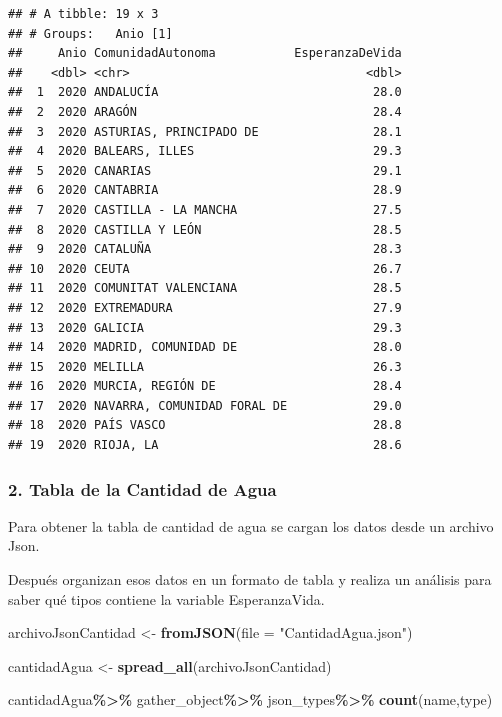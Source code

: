 \documentclass[
]{article}
\newenvironment{Shaded}{\begin{snugshade}}{\end{snugshade}}
\newcommand{\AttributeTok}[1]{\textcolor[rgb]{0.13,0.29,0.53}{#1}}
\newcommand{\FunctionTok}[1]{\textcolor[rgb]{0.13,0.29,0.53}{\textbf{#1}}}
\newcommand{\NormalTok}[1]{#1}
\newcommand{\OtherTok}[1]{\textcolor[rgb]{0.56,0.35,0.01}{#1}}
\newcommand{\SpecialCharTok}[1]{\textcolor[rgb]{0.81,0.36,0.00}{\textbf{#1}}}
\newcommand{\StringTok}[1]{\textcolor[rgb]{0.31,0.60,0.02}{#1}}
\begin{document}
\begin{verbatim}
## # A tibble: 19 x 3
## # Groups:   Anio [1]
##     Anio ComunidadAutonoma           EsperanzaDeVida
##    <dbl> <chr>                                 <dbl>
##  1  2020 ANDALUCÍA                              28.0
##  2  2020 ARAGÓN                                 28.4
##  3  2020 ASTURIAS, PRINCIPADO DE                28.1
##  4  2020 BALEARS, ILLES                         29.3
##  5  2020 CANARIAS                               29.1
##  6  2020 CANTABRIA                              28.9
##  7  2020 CASTILLA - LA MANCHA                   27.5
##  8  2020 CASTILLA Y LEÓN                        28.5
##  9  2020 CATALUÑA                               28.3
## 10  2020 CEUTA                                  26.7
## 11  2020 COMUNITAT VALENCIANA                   28.5
## 12  2020 EXTREMADURA                            27.9
## 13  2020 GALICIA                                29.3
## 14  2020 MADRID, COMUNIDAD DE                   28.0
## 15  2020 MELILLA                                26.3
## 16  2020 MURCIA, REGIÓN DE                      28.4
## 17  2020 NAVARRA, COMUNIDAD FORAL DE            29.0
## 18  2020 PAÍS VASCO                             28.8
## 19  2020 RIOJA, LA                              28.6
\end{verbatim}

\hypertarget{tabla-de-la-cantidad-de-agua}{%
\subsubsection{2. Tabla de la Cantidad de
Agua}\label{tabla-de-la-cantidad-de-agua}}

Para obtener la tabla de cantidad de agua se cargan los datos desde un
archivo Json.

Después organizan esos datos en un formato de tabla y realiza un
análisis para saber qué tipos contiene la variable EsperanzaVida.

\begin{Shaded}
\begin{Highlighting}[]
\NormalTok{archivoJsonCantidad }\OtherTok{\textless{}{-}} \FunctionTok{fromJSON}\NormalTok{(}\AttributeTok{file =} \StringTok{"CantidadAgua.json"}\NormalTok{)}

\NormalTok{cantidadAgua }\OtherTok{\textless{}{-}} \FunctionTok{spread\_all}\NormalTok{(archivoJsonCantidad)}

\NormalTok{cantidadAgua}\SpecialCharTok{\%\textgreater{}\%}
\NormalTok{  gather\_object}\SpecialCharTok{\%\textgreater{}\%}
\NormalTok{  json\_types}\SpecialCharTok{\%\textgreater{}\%}
  \FunctionTok{count}\NormalTok{(name,type)}
\end{Highlighting}
\end{Shaded}
\end{document}
